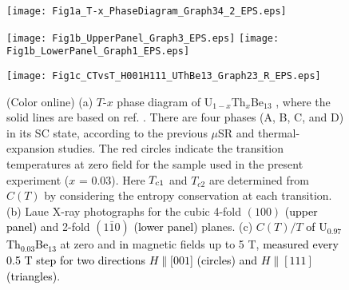\documentclass[twocolumn, prl]{revtex4}%
\newcommand{\correct}[1]{\textcolor{black}{#1}}
\begin{document}
 





\begin{centering}
\begin{figure}[t]
\begin{minipage}{4.0cm}
\texttt{[image: Fig1a\_T-x\_PhaseDiagram\_Graph34\_2\_EPS.eps]}
\end{minipage}
\begin{minipage}{4.0cm}
\texttt{[image: Fig1b\_UpperPanel\_Graph3\_EPS.eps]}
\texttt{[image: Fig1b\_LowerPanel\_Graph1\_EPS.eps]}
\end{minipage} 
\texttt{[image: Fig1c\_CTvsT\_H001H111\_UThBe13\_Graph23\_R\_EPS.eps]}
\caption{   (Color online)
 (a) 
 $T$-$x$ phase diagram of U$_{1-x}$Th$_{x}$Be$_{13}$ \cite{Heffner_PRL_1990, Kromer_PRL_1998}, where the solid lines are based on 
 ref. \cite{Kromer_PRL_1998}.
   There are  four phases (A, B, C, and D) in its SC state, according to the previous 
 $\mu$SR \cite{Heffner_PRL_1990} and thermal-expansion \cite{Kromer_PRL_1998} studies.
 The red circles
 indicate the transition temperatures  at zero field for the sample used in the present  experiment ($x$ = 0.03). 
Here  $T_{\rm c1}$ and $T_{c2}$ are 
 determined from $C(T)$ by considering the entropy conservation at each transition.
\color{black}
  (b) Laue X-ray photographs for  the cubic 4-fold $(100)$ \correct{(upper panel)} and    2-fold $(1\bar{1}0)$  \correct{(lower panel)} planes. 
 (c)  $C(T)/T$ \correct{of U$_{0.97}$Th$_{0.03}$Be$_{13}$} 
 at zero and \correct{in} magnetic fields up to 5 T, \correct{measured every 0.5 T step for two directions $H\parallel [001$] (circles) 
 and $H\parallel [111]$ (triangles)}.
 }
\end{figure}
\end{centering}
\end{document}
